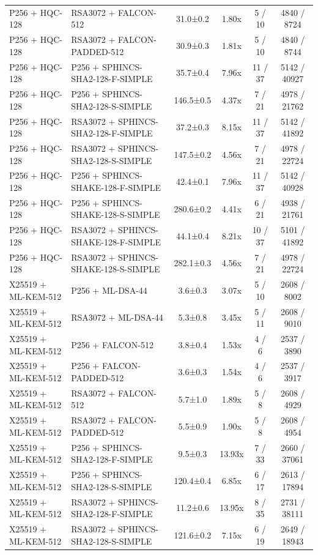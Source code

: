 \documentclass[10pt]{article}
\begin{document}
\begin{tabular}{@{}l l c c c c@{}}
P256 + HQC-128 & RSA3072 + FALCON-512 & 31.0±0.2 & 1.80x & 5 / 10 & 4840 / 8724 \\
P256 + HQC-128 & RSA3072 + FALCON-PADDED-512 & 30.9±0.3 & 1.81x & 5 / 10 & 4840 / 8744 \\
P256 + HQC-128 & P256 + SPHINCS-SHA2-128-F-SIMPLE & 35.7±0.4 & 7.96x & 11 / 37 & 5142 / 40927 \\
P256 + HQC-128 & P256 + SPHINCS-SHA2-128-S-SIMPLE & 146.5±0.5 & 4.37x & 7 / 21 & 4978 / 21762 \\
P256 + HQC-128 & RSA3072 + SPHINCS-SHA2-128-F-SIMPLE & 37.2±0.3 & 8.15x & 11 / 37 & 5142 / 41892 \\
P256 + HQC-128 & RSA3072 + SPHINCS-SHA2-128-S-SIMPLE & 147.5±0.2 & 4.56x & 7 / 21 & 4978 / 22724 \\
P256 + HQC-128 & P256 + SPHINCS-SHAKE-128-F-SIMPLE & 42.4±0.1 & 7.96x & 11 / 37 & 5142 / 40928 \\
P256 + HQC-128 & P256 + SPHINCS-SHAKE-128-S-SIMPLE & 280.6±0.2 & 4.41x & 6 / 21 & 4938 / 21761 \\
P256 + HQC-128 & RSA3072 + SPHINCS-SHAKE-128-F-SIMPLE & 44.1±0.4 & 8.21x & 10 / 37 & 5101 / 41892 \\
P256 + HQC-128 & RSA3072 + SPHINCS-SHAKE-128-S-SIMPLE & 282.1±0.3 & 4.56x & 7 / 21 & 4978 / 22724 \\
X25519 + ML-KEM-512 & P256 + ML-DSA-44 & 3.6±0.3 & 3.07x & 5 / 10 & 2608 / 8002 \\
X25519 + ML-KEM-512 & RSA3072 + ML-DSA-44 & 5.3±0.8 & 3.45x & 5 / 11 & 2608 / 9010 \\
X25519 + ML-KEM-512 & P256 + FALCON-512 & 3.8±0.4 & 1.53x & 4 / 6 & 2537 / 3890 \\
X25519 + ML-KEM-512 & P256 + FALCON-PADDED-512 & 3.6±0.3 & 1.54x & 4 / 6 & 2537 / 3917 \\
X25519 + ML-KEM-512 & RSA3072 + FALCON-512 & 5.7±1.0 & 1.89x & 5 / 8 & 2608 / 4929 \\
X25519 + ML-KEM-512 & RSA3072 + FALCON-PADDED-512 & 5.5±0.9 & 1.90x & 5 / 8 & 2608 / 4954 \\
X25519 + ML-KEM-512 & P256 + SPHINCS-SHA2-128-F-SIMPLE & 9.5±0.3 & 13.93x & 7 / 33 & 2660 / 37061 \\
X25519 + ML-KEM-512 & P256 + SPHINCS-SHA2-128-S-SIMPLE & 120.4±0.4 & 6.85x & 6 / 17 & 2613 / 17894 \\
X25519 + ML-KEM-512 & RSA3072 + SPHINCS-SHA2-128-F-SIMPLE & 11.2±0.6 & 13.95x & 8 / 35 & 2731 / 38111 \\
X25519 + ML-KEM-512 & RSA3072 + SPHINCS-SHA2-128-S-SIMPLE & 121.6±0.2 & 7.15x & 6 / 19 & 2649 / 18943 \\

\end{tabular}
\end{document}
